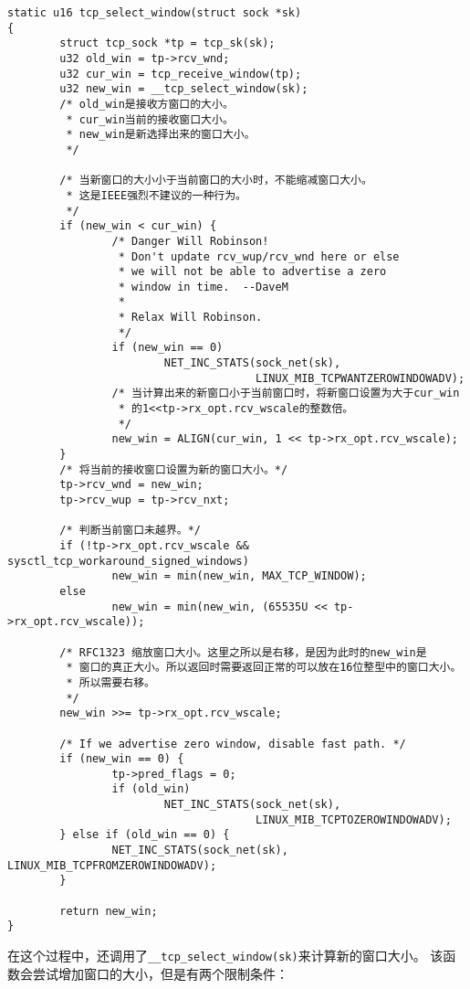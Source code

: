 \begin{verbatim}
static u16 tcp_select_window(struct sock *sk)
{
        struct tcp_sock *tp = tcp_sk(sk);
        u32 old_win = tp->rcv_wnd;
        u32 cur_win = tcp_receive_window(tp);
        u32 new_win = __tcp_select_window(sk);
        /* old_win是接收方窗口的大小。
         * cur_win当前的接收窗口大小。
         * new_win是新选择出来的窗口大小。
         */

        /* 当新窗口的大小小于当前窗口的大小时，不能缩减窗口大小。
         * 这是IEEE强烈不建议的一种行为。
         */
        if (new_win < cur_win) {
                /* Danger Will Robinson!
                 * Don't update rcv_wup/rcv_wnd here or else
                 * we will not be able to advertise a zero
                 * window in time.  --DaveM
                 *
                 * Relax Will Robinson.
                 */
                if (new_win == 0)
                        NET_INC_STATS(sock_net(sk),
                                      LINUX_MIB_TCPWANTZEROWINDOWADV);
                /* 当计算出来的新窗口小于当前窗口时，将新窗口设置为大于cur_win
                 * 的1<<tp->rx_opt.rcv_wscale的整数倍。
                 */
                new_win = ALIGN(cur_win, 1 << tp->rx_opt.rcv_wscale);
        }
        /* 将当前的接收窗口设置为新的窗口大小。*/
        tp->rcv_wnd = new_win;
        tp->rcv_wup = tp->rcv_nxt;

        /* 判断当前窗口未越界。*/
        if (!tp->rx_opt.rcv_wscale && sysctl_tcp_workaround_signed_windows)
                new_win = min(new_win, MAX_TCP_WINDOW);
        else
                new_win = min(new_win, (65535U << tp->rx_opt.rcv_wscale));

        /* RFC1323 缩放窗口大小。这里之所以是右移，是因为此时的new_win是
         * 窗口的真正大小。所以返回时需要返回正常的可以放在16位整型中的窗口大小。
         * 所以需要右移。
         */
        new_win >>= tp->rx_opt.rcv_wscale;

        /* If we advertise zero window, disable fast path. */
        if (new_win == 0) {
                tp->pred_flags = 0;
                if (old_win)
                        NET_INC_STATS(sock_net(sk),
                                      LINUX_MIB_TCPTOZEROWINDOWADV);
        } else if (old_win == 0) {
                NET_INC_STATS(sock_net(sk), LINUX_MIB_TCPFROMZEROWINDOWADV);
        }

        return new_win;
}
\end{verbatim}

在这个过程中，还调用了\texttt{__tcp_select_window(sk)}来计算新的窗口大小。
该函数会尝试增加窗口的大小，但是有两个限制条件：

